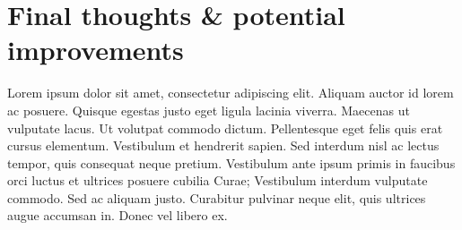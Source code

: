 \documentclass[11pt,a4paper]{article}
\begin{document}
\section{Final thoughts \& potential improvements}
Lorem ipsum dolor sit amet, consectetur adipiscing elit. Aliquam auctor id lorem ac posuere. Quisque egestas justo eget ligula lacinia viverra. Maecenas ut vulputate lacus. Ut volutpat commodo dictum. Pellentesque eget felis quis erat cursus elementum. Vestibulum et hendrerit sapien. Sed interdum nisl ac lectus tempor, quis consequat neque pretium. Vestibulum ante ipsum primis in faucibus orci luctus et ultrices posuere cubilia Curae; Vestibulum interdum vulputate commodo. Sed ac aliquam justo. Curabitur pulvinar neque elit, quis ultrices augue accumsan in. Donec vel libero ex.
\end{document}
